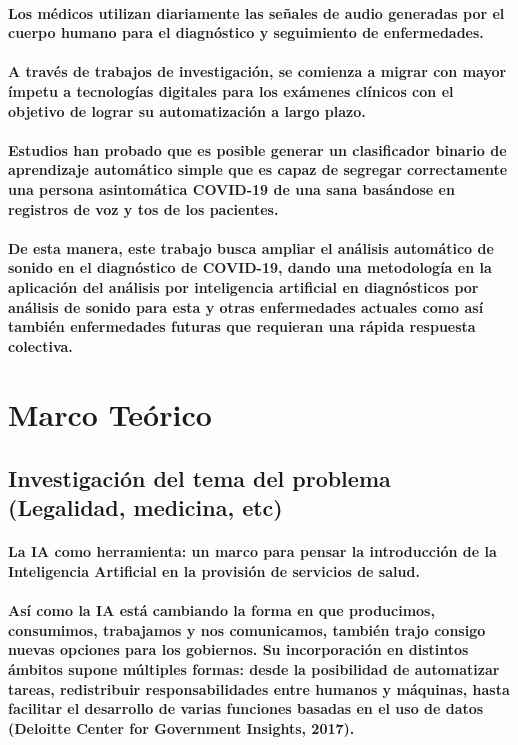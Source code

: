 \documentclass[a4paper,12pt]{article}
\begin{document}
\paragraph{Los médicos utilizan diariamente las señales de audio generadas por el cuerpo humano para el diagnóstico y seguimiento de enfermedades.}
\paragraph{A través de trabajos de investigación, se comienza a migrar con mayor ímpetu a tecnologías digitales para los exámenes clínicos con el objetivo de lograr su automatización a largo plazo.}
\paragraph{Estudios han probado que es posible generar un clasificador binario de aprendizaje automático simple que es capaz de segregar correctamente una persona asintomática COVID-19 de una sana basándose en registros de voz y tos de los pacientes.}
\paragraph{De esta manera, este trabajo busca ampliar el análisis automático de sonido en el diagnóstico de COVID-19, dando una metodología en la aplicación del análisis por inteligencia artificial en diagnósticos por análisis de sonido para esta y otras enfermedades actuales como así también enfermedades futuras que requieran una rápida respuesta colectiva.}
\section{Marco Teórico}
\subsection{Investigación del tema del problema (Legalidad, medicina, etc)}
\paragraph{La IA como herramienta: un marco para pensar la introducción de la Inteligencia Artificial en la provisión de servicios de salud.}
\paragraph{Así como la IA está cambiando la forma en que producimos, consumimos, trabajamos y nos comunicamos, también trajo consigo nuevas opciones para los gobiernos. Su incorporación en distintos ámbitos supone múltiples formas: desde la posibilidad de automatizar tareas, redistribuir responsabilidades entre humanos y máquinas, hasta facilitar el desarrollo de varias funciones basadas en el uso de datos (Deloitte Center for Government Insights, 2017).}
\end{document}
